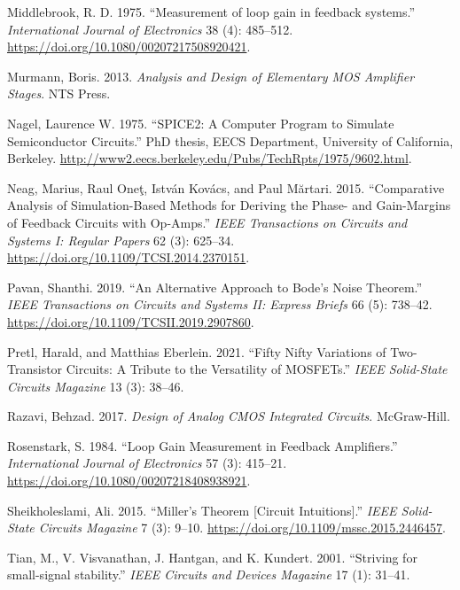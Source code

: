 \documentclass[
  a4paper,
  DIV=11,
  numbers=noendperiod]{scrartcl}
\newlength{\cslhangindent}
\newenvironment{CSLReferences}[2] %
 {\begin{list}{}{%
  \setlength{\itemindent}{0pt}
  \setlength{\leftmargin}{0pt}
  \setlength{\parsep}{0pt}
  \ifodd #1
   \setlength{\leftmargin}{\cslhangindent}
   \setlength{\itemindent}{-1\cslhangindent}
  \fi
  \setlength{\itemsep}{#2\baselineskip}}}
 {\end{list}}
\begin{document}
\begin{CSLReferences}{1}{0}
Middlebrook, R. D. 1975. {``{Measurement of loop gain in feedback
systems}.''} \emph{International Journal of Electronics} 38 (4):
485--512. \url{https://doi.org/10.1080/00207217508920421}.

Murmann, Boris. 2013. \emph{{Analysis and Design of Elementary MOS
Amplifier Stages}}. NTS Press.

Nagel, Laurence W. 1975. {``SPICE2: A Computer Program to Simulate
Semiconductor Circuits.''} PhD thesis, EECS Department, University of
California, Berkeley.
\url{http://www2.eecs.berkeley.edu/Pubs/TechRpts/1975/9602.html}.

Neag, Marius, Raul Oneţ, István Kovács, and Paul Mărtari. 2015.
{``Comparative Analysis of Simulation-Based Methods for Deriving the
Phase- and Gain-Margins of Feedback Circuits with Op-Amps.''} \emph{IEEE
Transactions on Circuits and Systems I: Regular Papers} 62 (3): 625--34.
\url{https://doi.org/10.1109/TCSI.2014.2370151}.

Pavan, Shanthi. 2019. {``An Alternative Approach to Bode's Noise
Theorem.''} \emph{IEEE Transactions on Circuits and Systems II: Express
Briefs} 66 (5): 738--42.
\url{https://doi.org/10.1109/TCSII.2019.2907860}.

Pretl, Harald, and Matthias Eberlein. 2021. {``Fifty Nifty Variations of
Two-Transistor Circuits: A Tribute to the Versatility of MOSFETs.''}
\emph{IEEE Solid-State Circuits Magazine} 13 (3): 38--46.

Razavi, Behzad. 2017. \emph{{Design of Analog CMOS Integrated
Circuits}}. McGraw-Hill.

Rosenstark, S. 1984. {``Loop Gain Measurement in Feedback Amplifiers.''}
\emph{International Journal of Electronics} 57 (3): 415--21.
\url{https://doi.org/10.1080/00207218408938921}.

Sheikholeslami, Ali. 2015. {``{Miller's Theorem {[}Circuit
Intuitions{]}}.''} \emph{IEEE Solid-State Circuits Magazine} 7 (3):
9--10. \url{https://doi.org/10.1109/mssc.2015.2446457}.

Tian, M., V. Visvanathan, J. Hantgan, and K. Kundert. 2001. {``{Striving
for small-signal stability}.''} \emph{IEEE Circuits and Devices
Magazine} 17 (1): 31--41.


\end{CSLReferences}
\end{document}
